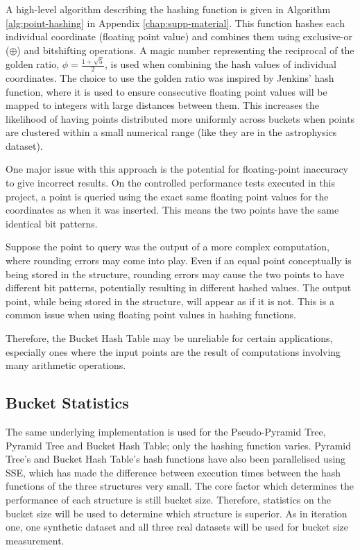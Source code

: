 A high-level algorithm describing the hashing function is given in Algorithm \ref{alg:point-hashing} in Appendix \ref{chap:supp-material}. This function hashes each individual coordinate (floating point value) and combines them using exclusive-or ($\oplus$) and bitshifting operations. A magic number representing the reciprocal of the golden ratio, $\phi = \frac{1 + \sqrt{5}}{2}$, is used when combining the hash values of individual coordinates. The choice to use the golden ratio was inspired by Jenkins' hash function\cite{hash-combine}, where it is used to ensure consecutive floating point values will be mapped to integers with large distances between them. This increases the likelihood of having points distributed more uniformly across buckets when points are clustered within a small numerical range (like they are in the astrophysics dataset).

One major issue with this approach is the potential for floating-point inaccuracy to give incorrect results. On the controlled performance tests executed in this project, a point is queried using the exact same floating point values for the coordinates as when it was inserted. This means the two points have the same identical bit patterns. 

Suppose the point to query was the output of a more complex computation, where rounding errors may come into play. Even if an equal point conceptually is being stored in the structure, rounding errors may cause the two points to have different bit patterns, potentially resulting in different hashed values. The output point, while being stored in the structure, will appear as if it is not. This is a common issue when using floating point values in hashing functions.

Therefore, the Bucket Hash Table may be unreliable for certain applications, especially ones where the input points are the result of computations involving many arithmetic operations.

\subsection{Bucket Statistics}

The same underlying implementation is used for the Pseudo-Pyramid Tree, Pyramid Tree and Bucket Hash Table; only the hashing function varies. Pyramid Tree's and Bucket Hash Table's hash functions have also been parallelised using SSE, which has made the difference between execution times between the hash functions of the three structures very small. The core factor which determines the performance of each structure is still bucket size. Therefore, statistics on the bucket size will be used to determine which structure is superior. As in iteration one, one synthetic dataset and all three real datasets will be used for bucket size measurement.

